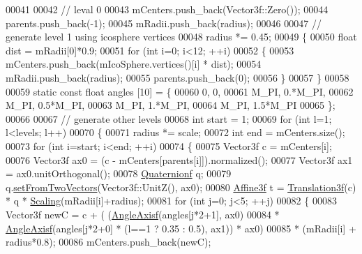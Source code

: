 \begin{DoxyCode}
00041 
00042       \textcolor{comment}{// leval 0}
00043       mCenters.push\_back(Vector3f::Zero());
00044       parents.push\_back(-1);
00045       mRadii.push\_back(radius);
00046 
00047       \textcolor{comment}{// generate level 1 using icosphere vertices}
00048       radius *= 0.45;
00049       \{
00050         \textcolor{keywordtype}{float} dist = mRadii[0]*0.9;
00051         \textcolor{keywordflow}{for} (\textcolor{keywordtype}{int} i=0; i<12; ++i)
00052         \{
00053           mCenters.push\_back(mIcoSphere.vertices()[i] * dist);
00054           mRadii.push\_back(radius);
00055           parents.push\_back(0);
00056         \}
00057       \}
00058 
00059       \textcolor{keyword}{static} \textcolor{keyword}{const} \textcolor{keywordtype}{float} angles [10] = \{
00060         0, 0,
00061         M\_PI, 0.*M\_PI,
00062         M\_PI, 0.5*M\_PI,
00063         M\_PI, 1.*M\_PI,
00064         M\_PI, 1.5*M\_PI
00065       \};
00066 
00067       \textcolor{comment}{// generate other levels}
00068       \textcolor{keywordtype}{int} start = 1;
00069       \textcolor{keywordflow}{for} (\textcolor{keywordtype}{int} l=1; l<levels; l++)
00070       \{
00071         radius *= scale;
00072         \textcolor{keywordtype}{int} end = mCenters.size();
00073         \textcolor{keywordflow}{for} (\textcolor{keywordtype}{int} i=start; i<end; ++i)
00074         \{
00075           Vector3f c = mCenters[i];
00076           Vector3f ax0 = (c - mCenters[parents[i]]).normalized();
00077           Vector3f ax1 = ax0.unitOrthogonal();
00078           \hyperlink{group___geometry___module_class_eigen_1_1_quaternion}{Quaternionf} q;
00079           q.\hyperlink{group___geometry___module_a61ce1b4b1faf6849c9663fd86e9b3a70}{setFromTwoVectors}(Vector3f::UnitZ(), ax0);
00080           \hyperlink{group___geometry___module_class_eigen_1_1_transform}{Affine3f} t = \hyperlink{group___geometry___module_class_eigen_1_1_translation}{Translation3f}(c) * q * \hyperlink{group___geometry___module_ga23a8ed57e3f2973526026765ae697761}{Scaling}(mRadii[i]+radius);
00081           \textcolor{keywordflow}{for} (\textcolor{keywordtype}{int} j=0; j<5; ++j)
00082           \{
00083             Vector3f newC = c + ( (\hyperlink{group___geometry___module_gadc7128416da41ca99bb8af814b78599e}{AngleAxisf}(angles[j*2+1], ax0)
00084                                 * \hyperlink{group___geometry___module_gadc7128416da41ca99bb8af814b78599e}{AngleAxisf}(angles[j*2+0] * (l==1 ? 0.35 : 0.5), ax1)) * ax0)
00085                                 * (mRadii[i] + radius*0.8);
00086             mCenters.push\_back(newC);

\end{DoxyCode}

